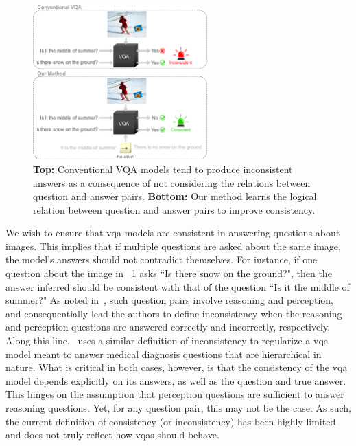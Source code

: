 \begin{figure}[!b]
\centering
\includegraphics[width=0.6\textwidth]{Figures/Part2_Consist/02_logic/image_intro.pdf}
\caption{\textbf{Top:} Conventional VQA models tend to produce inconsistent answers as a consequence of not considering the relations between question and answer pairs. \textbf{Bottom:} Our method learns the logical relation between question and answer pairs to improve consistency.
} 
\label{fig:image_intro}
\end{figure}

We wish to ensure that \gls{vqa} models are consistent in answering questions about images. This implies that if multiple questions are asked about the same image, the model's answers should not contradict themselves. For instance, if one question about the image in \fig~\ref{fig:image_intro} asks ``Is there snow on the ground?", then the answer inferred should be consistent with that of the question ``Is it the middle of summer?" As noted in~\cite{selvaraju2020squinting}, such question pairs involve reasoning and perception, and consequentially lead the authors to define inconsistency when the reasoning and perception questions are answered correctly and incorrectly, respectively. Along this line,~\cite{tascon2022consistency} uses a similar definition of inconsistency to regularize a \gls{vqa} model meant to answer medical diagnosis questions that are hierarchical in nature. What is critical in both cases, however, is that the consistency of the \gls{vqa} model depends explicitly on its answers, as well as the question and true answer. This hinges on the assumption that perception questions are sufficient to answer reasoning questions. Yet, for any question pair, this may not be the case. As such, the current definition of consistency (or inconsistency) has been highly limited and does not truly reflect how \gls{vqa}s should behave. 


